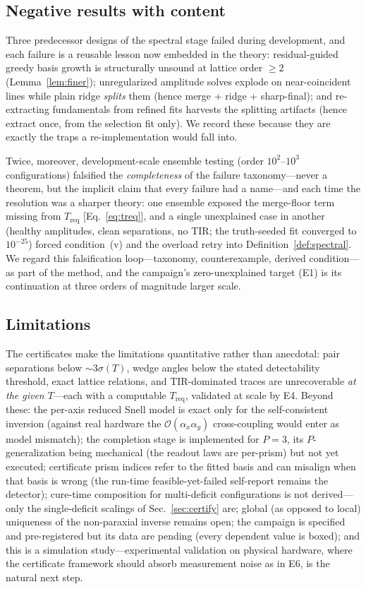 \documentclass[twocolumn,preprintnumbers,amsmath,amssymb,pra,floatfix]{revtex4-2}
\newcommand{\bigO}{\mathcal{O}}
\begin{document}
\subsection{Negative results with content}

Three predecessor designs of the spectral stage failed during
development, and each failure is a reusable lesson now embedded in the
theory: residual-guided greedy basis growth is structurally unsound at
lattice order $\ge2$ (Lemma~\ref{lem:finer}); unregularized amplitude
solves explode on near-coincident lines while plain ridge
\emph{splits} them (hence merge + ridge + sharp-final); and
re-extracting fundamentals from refined fits harvests the splitting
artifacts (hence extract once, from the selection fit only).  We record
these because they are exactly the traps a re-implementation would
fall into.

Twice, moreover, development-scale ensemble testing (order
$10^{2}$--$10^{3}$ configurations) falsified the \emph{completeness}
of the failure taxonomy---never a theorem, but the implicit claim
that every failure had a name---and each time the resolution was a
sharper theory: one ensemble exposed the merge-floor term missing
from $T_{\mathrm{req}}$ [Eq.~\eqref{eq:treq}], and a single
unexplained case in another (healthy amplitudes, clean separations,
no TIR; the truth-seeded fit converged to $10^{-25}$) forced
condition~(v) and the overload retry into
Definition~\ref{def:spectral}.  We regard this falsification
loop---taxonomy, counterexample, derived condition---as part of the
method, and the campaign's zero-unexplained target (E1) is its
continuation at three orders of magnitude larger scale.

\subsection{Limitations}

The certificates make the limitations quantitative rather than
anecdotal: pair separations below $\sim\!3\sigma(T)$, wedge angles
below the stated detectability threshold, exact lattice relations, and
TIR-dominated traces are unrecoverable \emph{at the given $T$}---each
with a computable $T_{\mathrm{req}}$, validated at scale by E4.
Beyond these: the per-axis reduced Snell model is exact only for
the self-consistent inversion (against real hardware the
$\bigO(\alpha_x\alpha_y)$ cross-coupling would enter as model
mismatch); the completion stage is implemented for $P{=}3$, its
$P$-generalization being mechanical (the readout laws are per-prism)
but not yet executed; certificate prism indices refer to the fitted
basis and can misalign when that basis is wrong (the run-time
feasible-yet-failed self-report remains the detector); cure-time
composition for multi-deficit configurations is not derived---only
the single-deficit scalings of Sec.~\ref{sec:certify} are; global
(as opposed to local) uniqueness of the non-paraxial inverse remains
open; the campaign is specified and pre-registered but its data are
pending (every dependent value is boxed); and this is a simulation
study---experimental validation on physical hardware, where the
certificate framework should absorb measurement noise as in E6, is
the natural next step.
\end{document}
